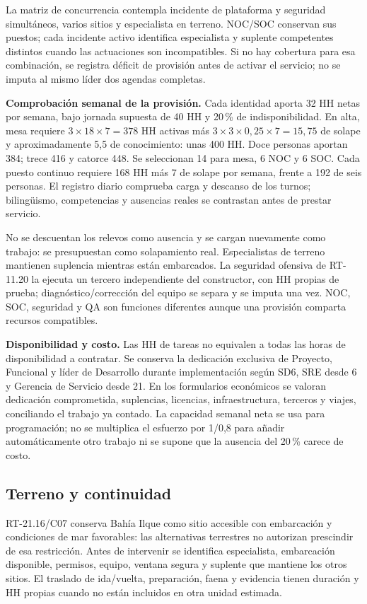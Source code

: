 La matriz de concurrencia contempla incidente de plataforma y seguridad simultáneos, varios sitios y especialista en terreno. NOC/SOC conservan sus puestos; cada incidente activo identifica especialista y suplente competentes distintos cuando las actuaciones son incompatibles. Si no hay cobertura para esa combinación, se registra déficit de provisión antes de activar el servicio; no se imputa al mismo líder dos agendas completas.


\textbf{Comprobación semanal de la provisión.} Cada identidad aporta 32 HH netas por semana, bajo jornada supuesta de 40 HH y 20\,\% de indisponibilidad. En alta, mesa requiere $3\times18\times7=378$ HH activas más $3\times3\times0,25\times7=15,75$ de solape y aproximadamente 5,5 de conocimiento: unas 400 HH. Doce personas aportan 384; trece 416 y catorce 448. Se seleccionan 14 para mesa, 6 NOC y 6 SOC. Cada puesto continuo requiere 168 HH más 7 de solape por semana, frente a 192 de seis personas. El registro diario comprueba carga y descanso de los turnos; bilingüismo, competencias y ausencias reales se contrastan antes de prestar servicio.

No se descuentan los relevos como ausencia y se cargan nuevamente como trabajo: se presupuestan como solapamiento real. Especialistas de terreno mantienen suplencia mientras están embarcados. La seguridad ofensiva de RT-11.20 la ejecuta un tercero independiente del constructor, con HH propias de prueba; diagnóstico/corrección del equipo se separa y se imputa una vez. NOC, SOC, seguridad y QA son funciones diferentes aunque una provisión comparta recursos compatibles.

\textbf{Disponibilidad y costo.} Las HH de tareas no equivalen a todas las horas de disponibilidad a contratar. Se conserva la dedicación exclusiva de Proyecto, Funcional y líder de Desarrollo durante implementación según SD6, SRE desde 6 y Gerencia de Servicio desde 21. En los formularios económicos se valoran dedicación comprometida, suplencias, licencias, infraestructura, terceros y viajes, conciliando el trabajo ya contado. La capacidad semanal neta se usa para programación; no se multiplica el esfuerzo por 1/0,8 para añadir automáticamente otro trabajo ni se supone que la ausencia del 20\,\% carece de costo.

\subsection{Terreno y continuidad}
RT-21.16/C07 conserva Bahía Ilque como sitio accesible con embarcación y condiciones de mar favorables: las alternativas terrestres no autorizan prescindir de esa restricción. Antes de intervenir se identifica especialista, embarcación disponible, permisos, equipo, ventana segura y suplente que mantiene los otros sitios. El traslado de ida/vuelta, preparación, faena y evidencia tienen duración y HH propias cuando no están incluidos en otra unidad estimada.

